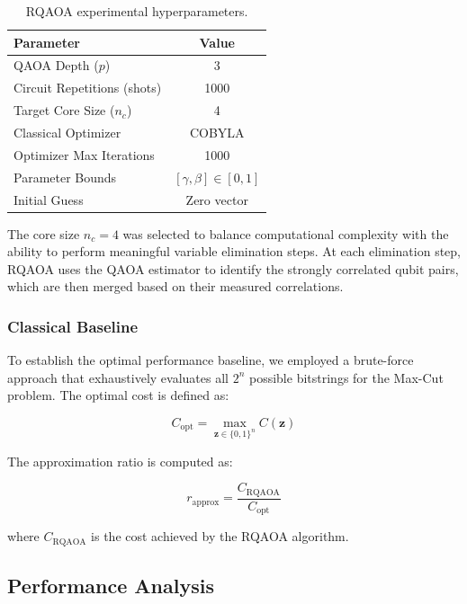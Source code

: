 \begin{table}[h]
\centering
\begin{tabular}{lc}
\hline
    \textbf{Parameter} & \textbf{Value} \\
\hline
    QAOA Depth ($p$) & 3 \\
    Circuit Repetitions (shots) & 1000 \\
    Target Core Size ($n_c$) & 4 \\
    Classical Optimizer & COBYLA \\
    Optimizer Max Iterations & 1000 \\
    Parameter Bounds & $[\gamma, \beta] \in [0, 1]$ \\
    Initial Guess & Zero vector \\
\hline
\end{tabular}
\caption{RQAOA experimental hyperparameters.}
\label{tab:rqaoa_params}
\end{table}

The core size $n_c = 4$ was selected to balance computational complexity with the ability to perform meaningful variable elimination steps. At each elimination step, RQAOA uses the QAOA estimator to identify the strongly correlated qubit pairs, which are then merged based on their measured correlations.

\subsubsection{Classical Baseline}
To establish the optimal performance baseline, we employed a brute-force approach that exhaustively evaluates all $2^n$ possible bitstrings for the Max-Cut problem. The optimal cost is defined as:

\begin{equation}
    C_{\text{opt}} = \max_{\mathbf{z} \in \{0,1\}^n} C(\mathbf{z})
\end{equation}

The approximation ratio is computed as:

\begin{equation}
    r_{\text{approx}} = \frac{C_{\text{RQAOA}}}{C_{\text{opt}}}
\end{equation}

where $C_{\text{RQAOA}}$ is the cost achieved by the RQAOA algorithm.

\subsection{Performance Analysis}
\label{subsec:performance}

